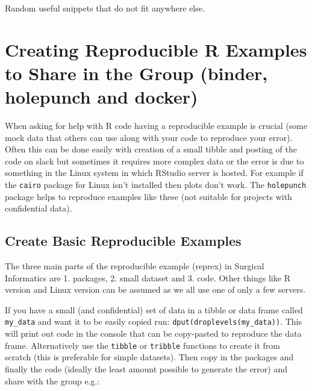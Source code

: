 \documentclass[]{book}
\begin{document}
Random useful snippets that do not fit anywhere else.

\hypertarget{creating-reproducible-r-examples-to-share-in-the-group-binder-holepunch-and-docker}{%
\section{Creating Reproducible R Examples to Share in the Group (binder, holepunch and docker)}\label{creating-reproducible-r-examples-to-share-in-the-group-binder-holepunch-and-docker}}

When asking for help with R code having a reproducible example is crucial (some mock data that others can use along with your code to reproduce your error). Often this can be done easily with creation of a small tibble and posting of the code on slack but sometimes it requires more complex data or the error is due to something in the Linux system in which RStudio server is hosted. For example if the \texttt{cairo} package for Linux isn't installed then plots don't work. The \texttt{holepunch} package helps to reproduce examples like these (not suitable for projects with confidential data).

\hypertarget{create-basic-reproducible-examples}{%
\subsection{Create Basic Reproducible Examples}\label{create-basic-reproducible-examples}}

The three main parts of the reproducible example (reprex) in Surgical Informatics are 1. packages, 2. small dataset and 3. code. Other things like R version and Linux version can be assumed as we all use one of only a few servers.

If you have a small (and confidential) set of data in a tibble or data frame called \texttt{my\_data} and want it to be easily copied run: \texttt{dput(droplevels(my\_data))}. This will print out code in the console that can be copy-pasted to reproduce the data frame. Alternatively use the \texttt{tibble} or \texttt{tribble} functions to create it from scratch (this is preferable for simple datasets). Then copy in the packages and finally the code (ideally the least amount possible to generate the error) and share with the group e.g.:
\end{document}
